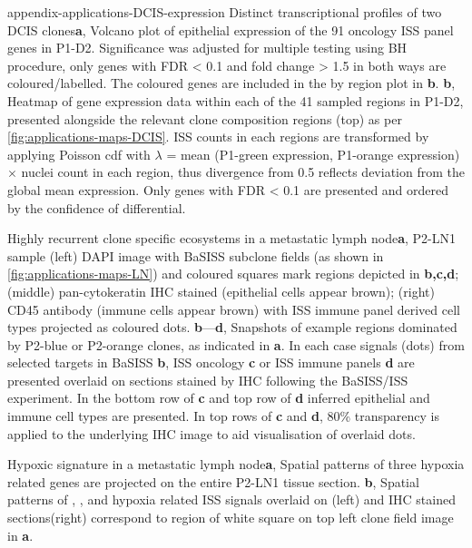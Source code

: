     {appendix-applications-DCIS-expression}
    {Distinct transcriptional profiles of two \ac{DCIS} clones}{\textbf{a}, Volcano plot of epithelial expression of the 91 oncology \ac{ISS} panel genes in P1-D2. Significance was adjusted for multiple testing using BH procedure, only genes with \ac{FDR} < 0.1 and fold change > 1.5 in both ways are coloured/labelled. The coloured genes are included in the by region plot in \textbf{b}. \textbf{b}, Heatmap of gene expression data within each of the 41 sampled regions in P1-D2, presented alongside the relevant clone composition regions (top) as per \cref{fig:applications-maps-DCIS}. \ac{ISS} counts in each regions are transformed by applying Poisson cdf with $\lambda$ = mean (P1-green expression, P1-orange expression) $\times$ nuclei count in each region, thus divergence from 0.5 reflects deviation from the global mean expression. Only genes with \ac{FDR} < 0.1 are presented and ordered by the confidence of differential.}

    {Highly recurrent clone specific ecosystems in a metastatic lymph node}{\textbf{a}, P2-LN1 sample (left) DAPI image with \ac{BaSISS} subclone fields (as shown in \cref{fig:applications-maps-LN}) and coloured squares mark regions depicted in \textbf{b,c,d}; (middle) pan-cytokeratin \ac{IHC} stained (epithelial cells appear brown); (right) CD45 antibody (immune cells appear brown) with ISS immune panel derived cell types projected as coloured dots. \textbf{b}—\textbf{d}, Snapshots of example regions dominated by P2-blue or P2-orange clones, as indicated in \textbf{a}. In each case signals (dots) from selected targets in BaSISS \textbf{b}, \ac{ISS} oncology \textbf{c} or \ac{ISS} immune panels \textbf{d} are presented overlaid on sections stained by \ac{IHC} following the \ac{BaSISS}/\ac{ISS} experiment. In the bottom row of \textbf{c} and top row of \textbf{d} inferred epithelial and immune cell types are presented. In top rows of \textbf{c} and \textbf{d}, 80\% transparency is applied to the underlying \ac{IHC} image to aid visualisation of overlaid dots.}

    {Hypoxic signature in a metastatic lymph node}{\textbf{a}, Spatial patterns of three hypoxia related genes are projected on the entire P2-LN1 tissue section. \textbf{b}, Spatial patterns of , ,  and hypoxia related \ac{ISS} signals overlaid on  (left) and  \ac{IHC} stained sections(right) correspond to region of white square on top left clone field image in \textbf{a}.}